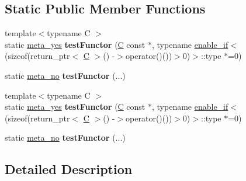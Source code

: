 \subsection*{Static Public Member Functions}
\begin{DoxyCompactItemize}
\item 
\mbox{\label{struct_eigen_1_1internal_1_1has__nullary__operator_ae734e5f26d9632a75bb0a0113b4a2f5d}} 
{\footnotesize template$<$typename C $>$ }\\static \hyperlink{struct_eigen_1_1internal_1_1meta__yes}{meta\+\_\+yes} {\bfseries test\+Functor} (\hyperlink{group___core___module}{C} const $\ast$, typename \hyperlink{struct_eigen_1_1internal_1_1enable__if}{enable\+\_\+if}$<$(sizeof(return\+\_\+ptr$<$ \hyperlink{group___core___module}{C} $>$() -\/$>$operator()())$>$0)$>$\+::type $\ast$=0)
\item 
\mbox{\label{struct_eigen_1_1internal_1_1has__nullary__operator_a5ec0cda0d8cfedf9c26a9c3d352b7914}} 
static \hyperlink{struct_eigen_1_1internal_1_1meta__no}{meta\+\_\+no} {\bfseries test\+Functor} (...)
\item 
\mbox{\label{struct_eigen_1_1internal_1_1has__nullary__operator_ae734e5f26d9632a75bb0a0113b4a2f5d}} 
{\footnotesize template$<$typename C $>$ }\\static \hyperlink{struct_eigen_1_1internal_1_1meta__yes}{meta\+\_\+yes} {\bfseries test\+Functor} (\hyperlink{group___core___module}{C} const $\ast$, typename \hyperlink{struct_eigen_1_1internal_1_1enable__if}{enable\+\_\+if}$<$(sizeof(return\+\_\+ptr$<$ \hyperlink{group___core___module}{C} $>$() -\/$>$operator()())$>$0)$>$\+::type $\ast$=0)
\item 
\mbox{\label{struct_eigen_1_1internal_1_1has__nullary__operator_a5ec0cda0d8cfedf9c26a9c3d352b7914}} 
static \hyperlink{struct_eigen_1_1internal_1_1meta__no}{meta\+\_\+no} {\bfseries test\+Functor} (...)
\end{DoxyCompactItemize}


\subsection{Detailed Description}
